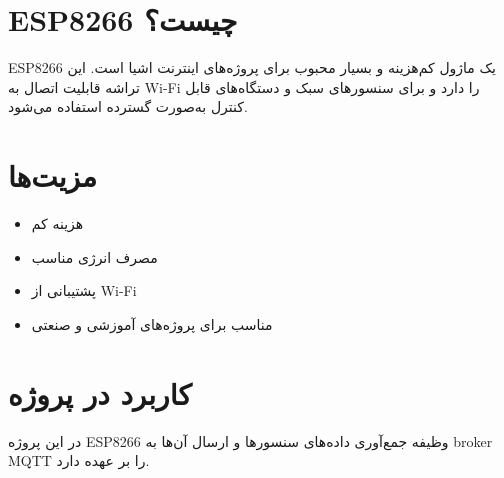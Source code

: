 \section{ESP8266 چیست؟}

ESP8266 یک ماژول کم‌هزینه و بسیار محبوب برای پروژه‌های اینترنت اشیا است. این تراشه قابلیت اتصال به Wi-Fi را دارد و برای سنسورهای سبک و دستگاه‌های قابل کنترل به‌صورت گسترده استفاده می‌شود.

\section{مزیت‌ها}

\begin{itemize}
    \item هزینه کم
    \item مصرف انرژی مناسب
    \item پشتیبانی از Wi-Fi
    \item مناسب برای پروژه‌های آموزشی و صنعتی
\end{itemize}

\section{کاربرد در پروژه}

در این پروژه ESP8266 وظیفه جمع‌آوری داده‌های سنسورها و ارسال آن‌ها به broker MQTT را بر عهده دارد.
